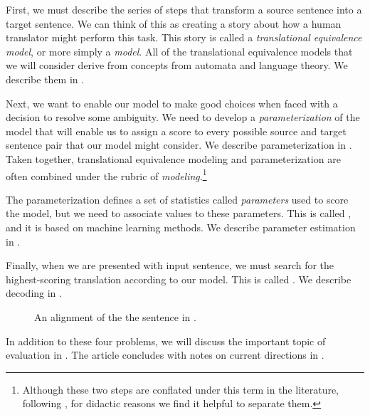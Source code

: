 \begin{asparaenum}

\item First, we must describe the series of steps
that transform a source sentence into a target sentence.
We can think of this as creating a story about how a human
translator might perform this task.  This story is called
a {\em translational equivalence model}, or more simply a
{\em model}.  All of the translational equivalence models
that we will consider derive from concepts from
automata and language theory.  We describe them in 
.

\item Next, we want to enable our model to make good
choices when faced with a decision to resolve some ambiguity.
We need to develop a {\em parameterization} of the model that will
enable us to assign a score to every possible source and target
sentence pair that our model might consider. We describe 
parameterization in .
Taken together, translational equivalence modeling and
parameterization are often combined under the rubric of
{\em modeling}.\footnote{Although these two steps
are conflated under this term in the literature, 
following \citet{Brown:1990:cl}, for didactic 
reasons we find it helpful to separate them.}

\item The parameterization defines a set of statistics 
called {\em parameters} used to score the model,
but we need to associate values to these parameters.
This is called , and it
is based on machine learning methods.
We describe parameter estimation 
in .

\item Finally, when we are presented with 
input sentence, we must search for the
highest-scoring translation according to our model.  
This is called .  
We describe decoding in 
.
\end{asparaenum} 

\figpreamble
\begin{figure*}[t]
\figfontsize{\begin{center}

\end{center}}
\figpostamble
\caption{\label{fig:alignment}An alignment of
the the sentence in .}
\end{figure*}

In addition to these four problems, we will 
discuss the important 
topic of evaluation in .  The 
article concludes with notes on current directions 
in .

